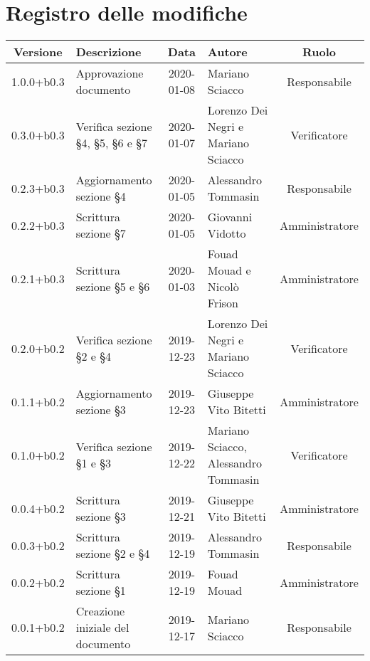 \section*{Registro delle modifiche}

\begin{center}
	\begin{longtable}{|c|p{3cm}|c|p{4cm}|c|}
	\hline
	\rowcolor{lighter-grayer}
	\textbf{Versione} & \textbf{Descrizione} & \textbf{Data} & \textbf{Autore} & \textbf{Ruolo} \\
	\hline
	\endfirsthead

	1.0.0+b0.3 & Approvazione documento & 2020-01-08 & Mariano Sciacco & Responsabile \\
	\hline 
	0.3.0+b0.3 & Verifica sezione \S4, \S5, \S6 e \S7 & 2020-01-07 & Lorenzo Dei Negri e Mariano Sciacco & Verificatore \\
	\hline
	0.2.3+b0.3 & Aggiornamento sezione \S4  & 2020-01-05 & Alessandro Tommasin & Responsabile \\
	\hline  
	0.2.2+b0.3 & Scrittura sezione \S7  & 2020-01-05 & Giovanni Vidotto & Amministratore \\
	\hline 
	0.2.1+b0.3 & Scrittura sezione \S5 e \S6  & 2020-01-03 & Fouad Mouad e Nicolò Frison & Amministratore \\
	\hline 
	0.2.0+b0.2 & Verifica sezione \S2 e \S4  & 2019-12-23 & Lorenzo Dei Negri e Mariano Sciacco & Verificatore \\
	\hline 
	0.1.1+b0.2 & Aggiornamento sezione \S3 & 2019-12-23 & Giuseppe Vito Bitetti & Amministratore \\
	\hline
	0.1.0+b0.2 & Verifica sezione \S1 e \S3 & 2019-12-22 & Mariano Sciacco, Alessandro Tommasin & Verificatore \\
	\hline 
	0.0.4+b0.2 & Scrittura sezione \S3 & 2019-12-21 & Giuseppe Vito Bitetti & Amministratore \\
	\hline 
	0.0.3+b0.2 & Scrittura sezione \S2 e \S4 & 2019-12-19 & Alessandro Tommasin & Responsabile \\
	\hline 
	0.0.2+b0.2 & Scrittura sezione \S1 & 2019-12-19 & Fouad Mouad & Amministratore \\
	\hline 
	0.0.1+b0.2 & Creazione iniziale del documento & 2019-12-17 & Mariano Sciacco & Responsabile \\
	\hline
	

	\end{longtable}
\end{center}